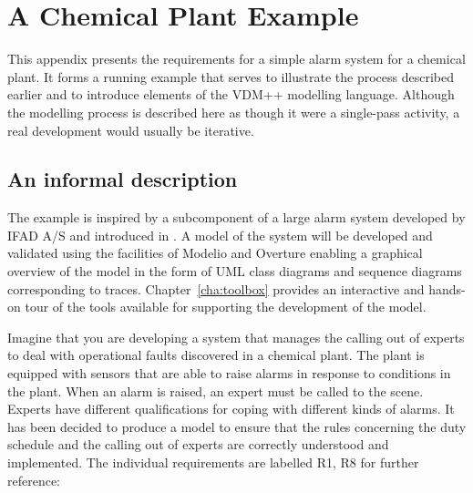 \appendix
\chapter{A Chemical Plant Example}\label{app:alarm}
This appendix presents the requirements for a simple alarm system for a chemical plant. It forms a running example that serves to illustrate the process described earlier and to introduce elements of the VDM++ modelling language. Although the modelling process is described here as though it were a single-pass activity, a real development would usually be iterative.
%
\section{An informal description}
The example is inspired by a subcomponent of a large alarm system developed by IFAD A/S and introduced in \cite{Fitzgerald&98b}.  A model of the system will be developed and validated using the facilities of Modelio and Overture
enabling a graphical overview of the model in the form of UML class diagrams and sequence diagrams corresponding to traces. Chapter~\ref{cha:toolbox} provides an interactive and hands-on tour of the tools available for supporting the development of the model.

Imagine that you are developing a system that manages the calling out of experts to deal with operational faults discovered in a chemical plant.  The plant is equipped with sensors that are able to raise alarms in response to conditions in the plant.  When an alarm is raised, an expert must be called to the scene.  Experts have different qualifications for coping with different kinds of alarms. It has been decided to produce a model to ensure that the rules
concerning the duty schedule and the calling out of experts are correctly understood and implemented. The individual requirements are labelled R1, R8 for further reference:

